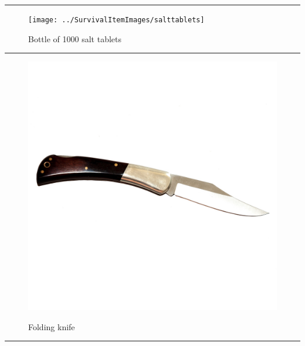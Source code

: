 \documentclass{article}
\begin{document}
    
        \par\noindent\rule{\textwidth}{0.4pt}
    \begin{figure}[H]
        \centering
        \begin{minipage}{0.25\textwidth}
            \centering
            \texttt{[image: ../SurvivalItemImages/salttablets]}
        \end{minipage}\hfill
        \begin{minipage}{0.7\textwidth}
            \centering
            \Large Bottle of 1000 salt tablets
        \end{minipage}
    \end{figure}
    \vspace{-0.8em}
    \noindent\rule{\textwidth}{0.4pt}
            
    \begin{figure}[H]
        \centering
        \begin{minipage}{0.25\textwidth}
            \centering
            \includegraphics[width=\textwidth]{../SurvivalItemImages/knife}
        \end{minipage}\hfill
        \begin{minipage}{0.7\textwidth}
            \centering
            \Large Folding knife
        \end{minipage}
    \end{figure}
    \vspace{-0.8em}
    \noindent\rule{\textwidth}{0.4pt}
            
\end{document}
